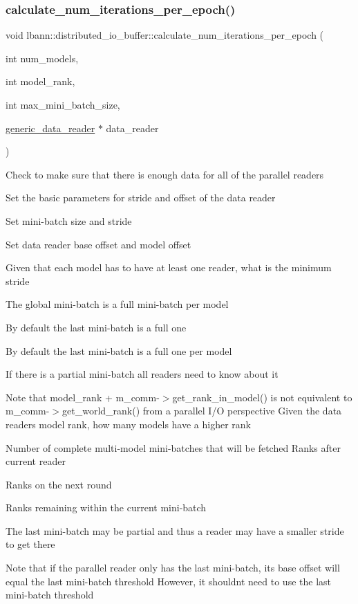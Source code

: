 \subsubsection{\texorpdfstring{calculate\+\_\+num\+\_\+iterations\+\_\+per\+\_\+epoch()}{calculate\_num\_iterations\_per\_epoch()}}
{\footnotesize\ttfamily void lbann\+::distributed\+\_\+io\+\_\+buffer\+::calculate\+\_\+num\+\_\+iterations\+\_\+per\+\_\+epoch (\begin{DoxyParamCaption}\item[{int}]{num\+\_\+models,  }\item[{int}]{model\+\_\+rank,  }\item[{int}]{max\+\_\+mini\+\_\+batch\+\_\+size,  }\item[{\hyperlink{classlbann_1_1generic__data__reader}{generic\+\_\+data\+\_\+reader} $\ast$}]{data\+\_\+reader }\end{DoxyParamCaption})}

Check to make sure that there is enough data for all of the parallel readers

Set the basic parameters for stride and offset of the data reader

Set mini-\/batch size and stride

Set data reader base offset and model offset

Given that each model has to have at least one reader, what is the minimum stride

The global mini-\/batch is a full mini-\/batch per model

By default the last mini-\/batch is a full one

By default the last mini-\/batch is a full one per model

If there is a partial mini-\/batch all readers need to know about it

Note that model\+\_\+rank + m\+\_\+comm-\/$>$get\+\_\+rank\+\_\+in\+\_\+model() is not equivalent to m\+\_\+comm-\/$>$get\+\_\+world\+\_\+rank() from a parallel I/O perspective Given the data readers model rank, how many models have a higher rank

Number of complete multi-\/model mini-\/batches that will be fetched Ranks after current reader

Ranks on the next round

Ranks remaining within the current mini-\/batch

The last mini-\/batch may be partial and thus a reader may have a smaller stride to get there

Note that if the parallel reader only has the last mini-\/batch, its base offset will equal the last mini-\/batch threshold However, it shouldn\textquotesingle{}t need to use the last mini-\/batch threshold

